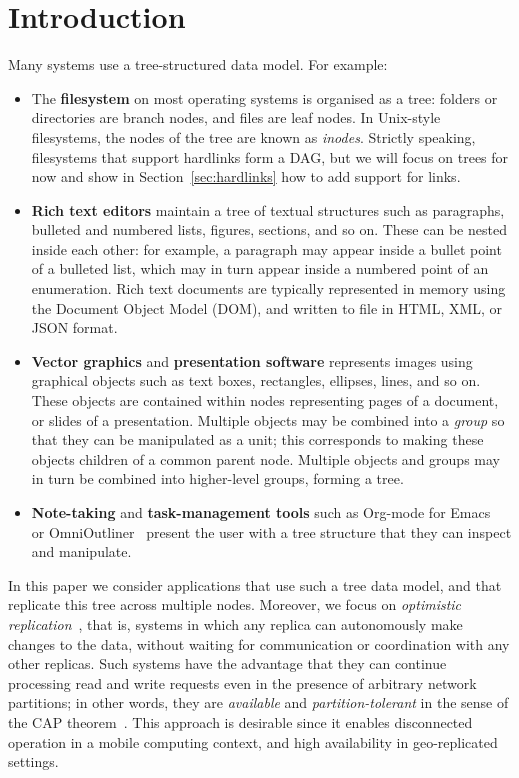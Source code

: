 \documentclass[sigconf]{acmart}
\begin{document}
\section{Introduction}\label{sec:intro}

Many systems use a tree-structured data model.
For example:
\begin{itemize}
    \item The \textbf{filesystem} on most operating systems is organised as a tree: folders or directories are branch nodes, and files are leaf nodes.
        In Unix-style filesystems, the nodes of the tree are known as \emph{inodes}.
        Strictly speaking, filesystems that support hardlinks form a DAG, but we will focus on trees for now and show in Section~\ref{sec:hardlinks} how to add support for links.
    \item \textbf{Rich text editors} maintain a tree of textual structures such as paragraphs, bulleted and numbered lists, figures, sections, and so on.
        These can be nested inside each other: for example, a paragraph may appear inside a bullet point of a bulleted list, which may in turn appear inside a numbered point of an enumeration.
        Rich text documents are typically represented in memory using the Document Object Model (DOM), and written to file in HTML, XML, or JSON format.
    \item \textbf{Vector graphics} and \textbf{presentation software} represents images using graphical objects such as text boxes, rectangles, ellipses, lines, and so on.
        These objects are contained within nodes representing pages of a document, or slides of a presentation.
        Multiple objects may be combined into a \emph{group} so that they can be manipulated as a unit; this corresponds to making these objects children of a common parent node.
        Multiple objects and groups may in turn be combined into higher-level groups, forming a tree.
    \item \textbf{Note-taking} and \textbf{task-management tools} such as Org-mode for Emacs~\cite{OrgMode} or OmniOutliner~\cite{OmniOutliner} present the user with a tree structure that they can inspect and manipulate.
\end{itemize}

In this paper we consider applications that use such a tree data model, and that replicate this tree across multiple nodes.
Moreover, we focus on \emph{optimistic replication}~\cite{Saito:2005jw}, that is, systems in which any replica can autonomously make changes to the data, without waiting for communication or coordination with any other replicas.
Such systems have the advantage that they can continue processing read and write requests even in the presence of arbitrary network partitions; in other words, they are \emph{available} and \emph{partition-tolerant} in the sense of the CAP theorem~\cite{Gilbert:2002il}.
This approach is desirable since it enables disconnected operation in a mobile computing context, and high availability in geo-replicated settings.
\end{document}
